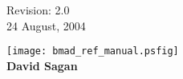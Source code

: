 \thispagestyle{empty}

\begin{flushright}
\large
  Revision: 2.0 \\
  24 August, 2004 \\
\end{flushright}

\vfill

{
\begin{center}
\texttt{[image: bmad\_ref\_manual.psfig]} \\
\vskip 0.3in
\huge\bf David Sagan
\end{center}
}


\vfill
\break